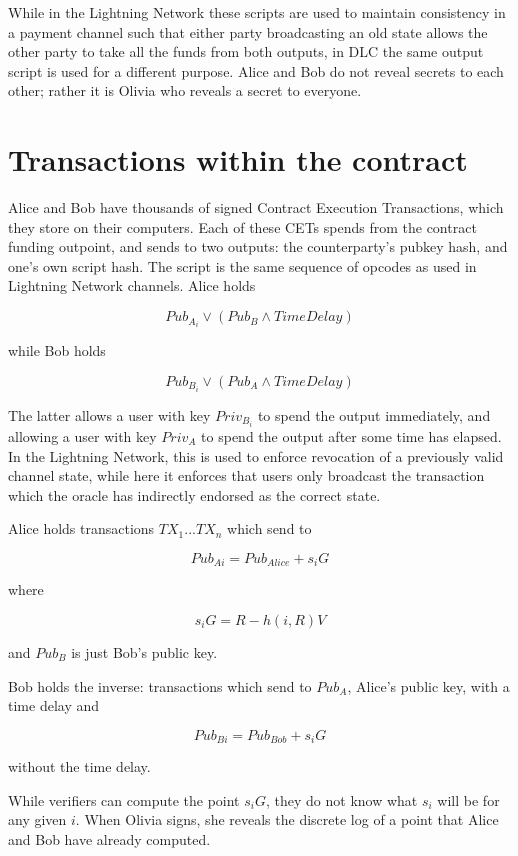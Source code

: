 \documentclass[10pt]{article}
\begin{document}
While in the Lightning Network these scripts are used to maintain consistency in a payment channel such that either party broadcasting an old state allows the other party to take all the funds from both outputs, in DLC the same output script is used for a different purpose.  Alice and Bob do not reveal secrets to each other; rather it is Olivia who reveals a secret to everyone.


\section*{Transactions within the contract}

Alice and Bob have thousands of signed Contract Execution Transactions,  which they store on their computers.  Each of these CETs spends from the contract funding outpoint, and sends to two outputs: the counterparty's pubkey hash, and one's own script hash.  The script is the same sequence of opcodes as used in Lightning Network channels.  Alice holds

\[Pub_{A_i} \lor (Pub_{B} \land TimeDelay)\]

while Bob holds

\[Pub_{B_i} \lor (Pub_{A} \land TimeDelay)\]


The latter allows a user with key \(Priv_{B_i}\) to spend the output immediately, and allowing a user with key \(Priv_{A}\) to spend the output after some time has elapsed.  In the Lightning Network, this is used to enforce revocation of a previously valid  channel state,  while  here it enforces  that users only broadcast the transaction which the oracle has indirectly endorsed as the correct state.

Alice holds transactions \(TX_{1} ... TX_{n}\) which send to

\[Pub_{Ai} = Pub_{Alice} + s_iG\]

where 

\[s_iG = R - h(i, R)V\]

and \(Pub_B\) is just Bob's public key.

Bob holds the inverse: transactions which send to \(Pub_A\), Alice's public key, with a time delay and 

\[Pub_{Bi} = Pub_{Bob} + s_iG\]

without the time delay.

While verifiers can compute the point \(s_iG\), they do not know what \(s_i\) will be for any given \(i\).  When Olivia signs, she reveals the discrete log of a point that Alice and Bob have already computed.
\end{document}
